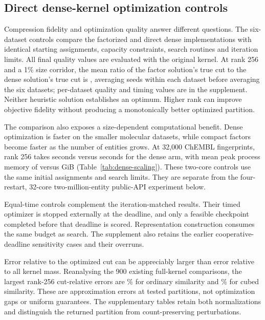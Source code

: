 \subsection{Direct dense-kernel optimization controls}

Compression fidelity and optimization quality answer different questions.
The six-dataset controls compare the factorized and direct dense
implementations with identical starting assignments, capacity constraints,
search routines and iteration limits. All final quality values are evaluated
with the original kernel. At rank 256 and a 1\% size corridor, the mean ratio
of the factor solution's true cut to the dense solution's true cut is
\ControlsCutRatio{}, averaging seeds within each dataset before averaging the
six datasets; per-dataset quality and timing values are in the supplement.
Neither heuristic solution establishes an optimum. Higher rank
can improve objective fidelity without producing a monotonically better
optimized partition.

The comparison also exposes a size-dependent computational benefit. Dense
optimization is faster on the smaller molecular datasets, while compact
factors become faster as the number of entities grows. At 32,000 ChEMBL
fingerprints, rank 256 takes \ControlsLargeFactorSeconds{} seconds versus
\ControlsLargeDenseSeconds{} seconds for the dense arm, with mean peak process
memory of \ControlsLargeFactorRSS{} versus \ControlsLargeDenseRSS{} GiB
(Table~\ref{tab:dense-scaling}). These two-core controls use the same initial
assignments and search limits. They are separate from the four-restart,
32-core two-million-entity public-API experiment below.



Equal-time controls complement the iteration-matched results. Their timed
optimizer is stopped externally at the deadline, and only a feasible
checkpoint completed before that deadline is scored. Representation
construction consumes the same budget as search. The supplement also retains
the earlier cooperative-deadline sensitivity cases and their overruns.

Error relative to the optimized cut can be appreciably larger than error
relative to all kernel mass. Reanalysing the 900 existing full-kernel
comparisons, the largest rank-256 cut-relative errors are
\ControlsPlainCutError{}\% for ordinary similarity and
\ControlsPowerCutError{}\% for cubed similarity. These are approximation
errors at tested partitions, not optimization gaps or uniform guarantees.
The supplementary tables retain both normalizations and distinguish the
returned partition from count-preserving perturbations.

